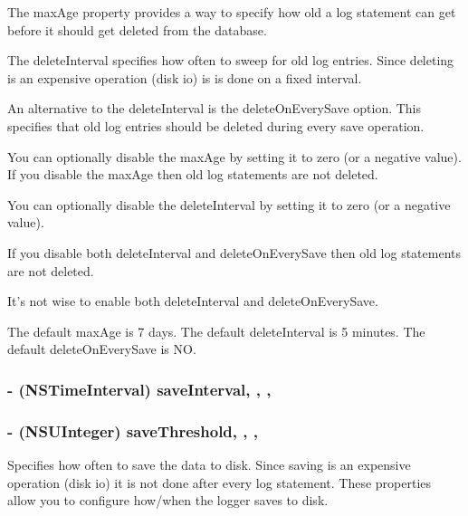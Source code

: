 The max\-Age property provides a way to specify how old a log statement can get before it should get deleted from the database.

The delete\-Interval specifies how often to sweep for old log entries. Since deleting is an expensive operation (disk io) is is done on a fixed interval.

An alternative to the delete\-Interval is the delete\-On\-Every\-Save option. This specifies that old log entries should be deleted during every save operation.

You can optionally disable the max\-Age by setting it to zero (or a negative value). If you disable the max\-Age then old log statements are not deleted.

You can optionally disable the delete\-Interval by setting it to zero (or a negative value).

If you disable both delete\-Interval and delete\-On\-Every\-Save then old log statements are not deleted.

It's not wise to enable both delete\-Interval and delete\-On\-Every\-Save.

The default max\-Age is 7 days. The default delete\-Interval is 5 minutes. The default delete\-On\-Every\-Save is N\-O. \hypertarget{interface_d_d_abstract_database_logger_ad9d79d66d716e4965fec5e7c137f729e}{
\subsubsection[{save\-Interval}]{\setlength{\rightskip}{0pt plus 5cm}-\/ (N\-S\-Time\-Interval) save\-Interval\hspace{0.3cm}{\ttfamily [read]}, {\ttfamily [write]}, {\ttfamily [atomic]}, {\ttfamily [assign]}}}\label{interface_d_d_abstract_database_logger_ad9d79d66d716e4965fec5e7c137f729e}
\hypertarget{interface_d_d_abstract_database_logger_a0f72f6042f001e34d18489e3c3864cec}{
\subsubsection[{save\-Threshold}]{\setlength{\rightskip}{0pt plus 5cm}-\/ (N\-S\-U\-Integer) save\-Threshold\hspace{0.3cm}{\ttfamily [read]}, {\ttfamily [write]}, {\ttfamily [atomic]}, {\ttfamily [assign]}}}\label{interface_d_d_abstract_database_logger_a0f72f6042f001e34d18489e3c3864cec}
Specifies how often to save the data to disk. Since saving is an expensive operation (disk io) it is not done after every log statement. These properties allow you to configure how/when the logger saves to disk.

